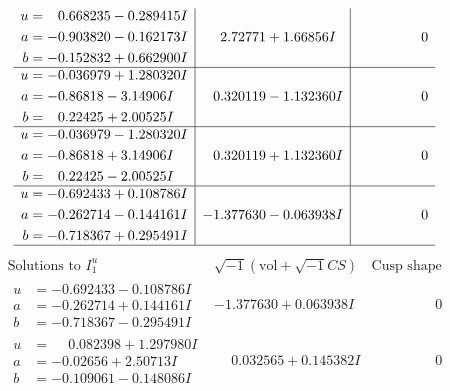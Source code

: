\documentclass[1p]{elsarticle_modified}
\theoremstyle{definition}
\newcommand{\I}{\sqrt{-1}}
\begin{document}
$$\begin{array}{c|c|c}
\begin{aligned}
u &= \phantom{-}0.668235 - 0.289415 I \\
a &= -0.903820 - 0.162173 I \\
b &= -0.152832 + 0.662900 I\end{aligned}
 & \phantom{-}2.72771 + 1.66856 I & \phantom{-0.000000 } 0 \\ \hline\begin{aligned}
u &= -0.036979 + 1.280320 I \\
a &= -0.86818 - 3.14906 I \\
b &= \phantom{-}0.22425 + 2.00525 I\end{aligned}
 & \phantom{-}0.320119 - 1.132360 I & \phantom{-0.000000 } 0 \\ \hline\begin{aligned}
u &= -0.036979 - 1.280320 I \\
a &= -0.86818 + 3.14906 I \\
b &= \phantom{-}0.22425 - 2.00525 I\end{aligned}
 & \phantom{-}0.320119 + 1.132360 I & \phantom{-0.000000 } 0 \\ \hline\begin{aligned}
u &= -0.692433 + 0.108786 I \\
a &= -0.262714 - 0.144161 I \\
b &= -0.718367 + 0.295491 I\end{aligned}
 & -1.377630 - 0.063938 I & \phantom{-0.000000 } 0\\
 \hline 
 \end{array}$$\newpage$$\begin{array}{c|c|c}  
\text{Solutions to }I^u_{1}& \I (\text{vol} + \sqrt{-1}CS) & \text{Cusp shape}\\
 \hline 
\begin{aligned}
u &= -0.692433 - 0.108786 I \\
a &= -0.262714 + 0.144161 I \\
b &= -0.718367 - 0.295491 I\end{aligned}
 & -1.377630 + 0.063938 I & \phantom{-0.000000 } 0 \\ \hline\begin{aligned}
u &= \phantom{-}0.082398 + 1.297980 I \\
a &= -0.02656 + 2.50713 I \\
b &= -0.109061 - 0.148086 I\end{aligned}
 & \phantom{-}0.032565 + 0.145382 I & \phantom{-0.000000 } 0 \\ \hline\begin{aligned}

\end{aligned}
\end{array}$$
\end{document}
